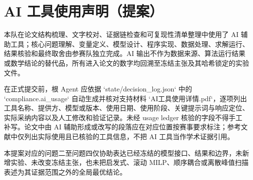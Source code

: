 \section{AI 工具使用声明（提案）}

本队在论文结构梳理、文字校对、证据链检查和可复现性清单整理中使用了 AI 辅助工具；核心问题理解、变量定义、模型设计、程序实现、数据处理、求解运行、结果核验和最终取舍由参赛队独立完成。AI 输出不作为数据来源、算法运行结果或数学结论的替代品，所有进入论文的数字均回溯至冻结主张及其哈希锁定的实验文件。

在正式提交前，根 Agent 应依据 `state/decision_log.json` 中的 `compliance.ai_usage` 自动生成并核对支持材料 `AI工具使用详情.pdf`，逐项列出工具名称、提供方、模型或版本、使用日期、使用阶段、关键提示词与响应定位、实际采纳内容以及人工修改和验证记录。未经 usage ledger 核验的字段不得手工补写。论文中由 AI 辅助形成或改写的段落应在对应位置按赛事要求标注；参考文献中仅列出实际使用且已核验的工具信息，不把 AI 工具当作学术证据引用。

本提案对应的问题二至问题四仅协助表达已经冻结的模型接口、结果和边界，未新增实验、未改变冻结主张，也未把启发式、滚动 MILP、顺序耦合或离散峰值扫描表述为其证据范围之外的全局最优结论。
